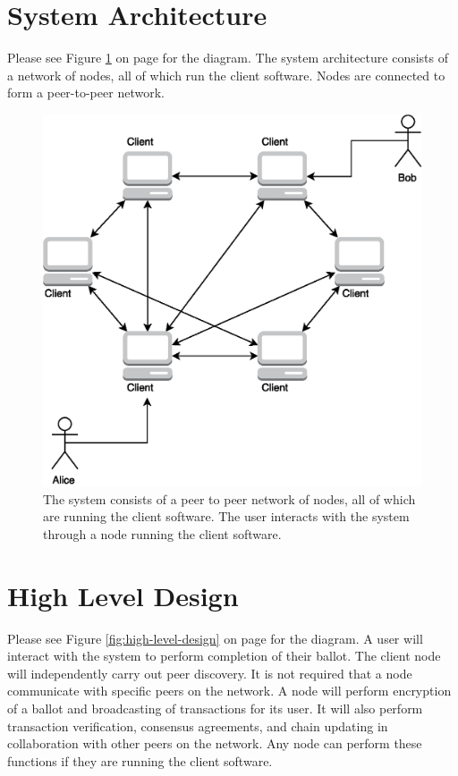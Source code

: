 \documentclass[a4paper,12pt]{article}
\begin{document}
\section{System Architecture}
Please see Figure \ref{fig:system-architecture} on page \pageref{fig:system-architecture} for the diagram. The system architecture consists of a network of nodes, all of which run the client software. Nodes are connected to form a peer-to-peer network.

\begin{figure}[ht]
\centering
\includegraphics[width=\textwidth]{SystemArchitecture.eps}
\caption{The system consists of a peer to peer network of nodes, all of which are running the client software. The user interacts with the system through a node running the client software.}
\label{fig:system-architecture}
\end{figure}

\section{High Level Design}
Please see Figure \ref{fig:high-level-design} on page \pageref{fig:high-level-design} for the diagram. A user will interact with the system to perform completion of their ballot. The client node will independently carry out peer discovery. It is not required that a node communicate with specific peers on the network. A node will perform encryption of a ballot and broadcasting of transactions for its user. It will also perform transaction verification, consensus agreements, and chain updating in collaboration with other peers on the network. Any node can perform these functions if they are running the client software.
\end{document}
